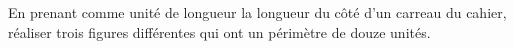 \begin{exercice}
    En prenant comme unité de longueur la longueur du côté d'un carreau du cahier, réaliser trois figures différentes qui ont un périmètre de douze unités.
 \end{exercice}